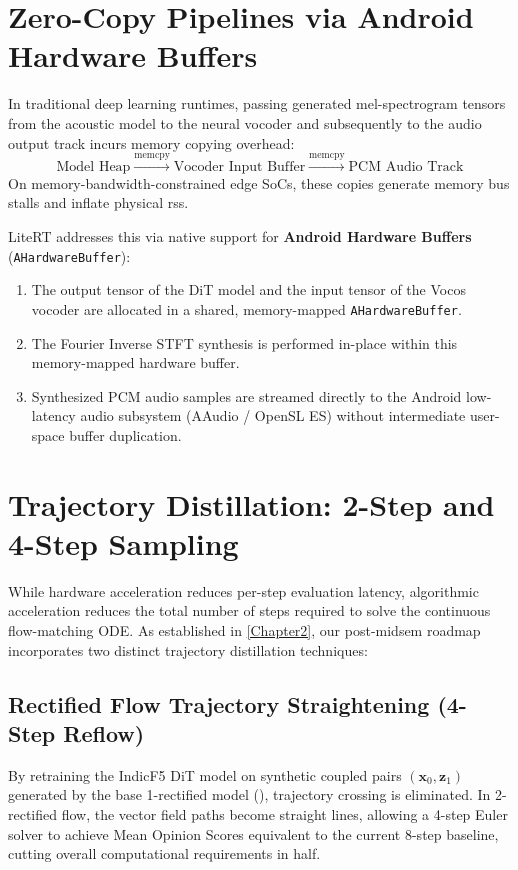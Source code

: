 \section{Zero-Copy Pipelines via Android Hardware Buffers}
In traditional deep learning runtimes, passing generated mel-spectrogram tensors from the acoustic model to the neural vocoder and subsequently to the audio output track incurs memory copying overhead:
\begin{equation}
    \text{Model Heap} \xrightarrow{\text{memcpy}} \text{Vocoder Input Buffer} \xrightarrow{\text{memcpy}} \text{PCM Audio Track}
\end{equation}
On memory-bandwidth-constrained edge SoCs, these copies generate memory bus stalls and inflate physical \gls{rss}.

LiteRT addresses this via native support for \textbf{Android Hardware Buffers} (\texttt{AHardwareBuffer}):
\begin{enumerate}
    \item The output tensor of the DiT model and the input tensor of the Vocos vocoder are allocated in a shared, memory-mapped \texttt{AHardwareBuffer}.
    \item The Fourier Inverse STFT synthesis is performed in-place within this memory-mapped hardware buffer.
    \item Synthesized PCM audio samples are streamed directly to the Android low-latency audio subsystem (AAudio / OpenSL ES) without intermediate user-space buffer duplication.
\end{enumerate}

\section{Trajectory Distillation: 2-Step and 4-Step Sampling}
While hardware acceleration reduces per-step evaluation latency, algorithmic acceleration reduces the total number of steps required to solve the continuous flow-matching ODE. As established in \cref{Chapter2}, our post-midsem roadmap incorporates two distinct trajectory distillation techniques:

\subsection{Rectified Flow Trajectory Straightening (4-Step Reflow)}
By retraining the IndicF5 DiT model on synthetic coupled pairs $(\mathbf{x}_0, \mathbf{z}_1)$ generated by the base 1-rectified model (), trajectory crossing is eliminated. In 2-rectified flow, the vector field paths become straight lines, allowing a 4-step Euler solver to achieve Mean Opinion Scores equivalent to the current 8-step baseline, cutting overall computational requirements in half.

